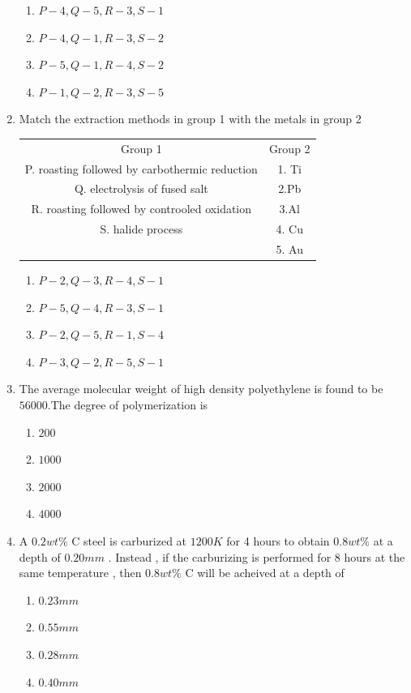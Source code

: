 \documentclass[journal]{IEEEtran}
\theoremstyle{remark}
\begin{document}
\begin{enumerate}
\begin{multicols}{2}
\begin{enumerate}
    \item $P-4,Q-5,R-3,S-1$
    \item $P-4,Q-1,R-3,S-2$
    \item $P-5,Q-1,R-4,S-2$
    \item $P-1,Q-2,R-3,S-5$
\end{enumerate}
\end{multicols}
\item  Match the extraction methods in group 1 with the metals in group 2 \hfill{}
\begin{center}
\begin{tabular}{c c}
Group 1     &Group 2  \\
P. roasting followed by carbothermic reduction     & 1. Ti\\
Q. electrolysis of fused salt & 2.Pb\\
R. roasting followed by controoled oxidation & 3.Al\\
S. halide process & 4. Cu\\
      &5. Au
\end{tabular}
\end{center}

\begin{multicols}{2}
\begin{enumerate}
\item $P-2,Q-3,R-4,S-1$
\item $P-5,Q-4,R-3,S-1$
\item $P-2,Q-5,R-1,S-4$
\item $P-3,Q-2,R-5,S-1$
\end{enumerate}
\end{multicols}

\item  The average molecular weight of high density polyethylene is found to be $56000$.The degree of polymerization is \hfill{}
\begin{multicols}{4}
\begin{enumerate}
\item $200$
\item $1000$
\item $2000$
\item $4000$
\end{enumerate}
\end{multicols}

\item A $0.2wt\%$ C steel is carburized at $1200K$ for 4 hours to obtain $0.8wt\%$ at a depth of $0.20mm$ . Instead , if the carburizing is performed for 8 hours at the same temperature , then $0.8wt\%$ C will be acheived at a depth of
\hfill{}
\begin{multicols}{4}
\begin{enumerate}
\item $0.23mm$
\item $0.55mm$
\item $0.28mm$
\item $0.40mm$
\end{enumerate}
\end{multicols}


\end{enumerate}
\end{document}
